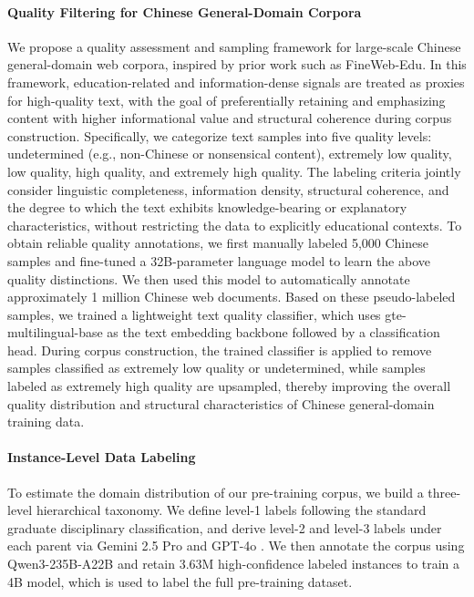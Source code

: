 \paragraph{Quality Filtering for Chinese General-Domain Corpora}
We propose a quality assessment and sampling framework for large-scale Chinese general-domain web corpora, inspired by prior work such as FineWeb-Edu\cite{penedo2024fineweb}. In this framework, education-related and information-dense signals are treated as proxies for high-quality text, with the goal of preferentially retaining and emphasizing content with higher informational value and structural coherence during corpus construction.
Specifically, we categorize text samples into five quality levels: undetermined (e.g., non-Chinese or nonsensical content), extremely low quality, low quality, high quality, and extremely high quality. The labeling criteria jointly consider linguistic completeness, information density, structural coherence, and the degree to which the text exhibits knowledge-bearing or explanatory characteristics, without restricting the data to explicitly educational contexts.
To obtain reliable quality annotations, we first manually labeled 5,000 Chinese samples and fine-tuned a 32B-parameter language model to learn the above quality distinctions. We then used this model to automatically annotate approximately 1 million Chinese web documents. Based on these pseudo-labeled samples, we trained a lightweight text quality classifier, which uses gte-multilingual-base as the text embedding backbone followed by a classification head.
During corpus construction, the trained classifier is applied to remove samples classified as extremely low quality or undetermined, while samples labeled as extremely high quality are upsampled, thereby improving the overall quality distribution and structural characteristics of Chinese general-domain training data.

\paragraph{Instance-Level Data Labeling} To estimate the domain distribution of our pre-training corpus, we build a three-level hierarchical taxonomy. We define level-1 labels following the standard graduate disciplinary classification, and derive level-2 and level-3 labels under each parent via Gemini 2.5 Pro \cite{comanici2025gemini} and GPT-4o \cite{achiam2023gpt}. We then annotate the corpus using Qwen3-235B-A22B \cite{yang2025qwen3} and retain 3.63M high-confidence labeled instances to train a 4B model, which is used to label the full pre-training dataset.

